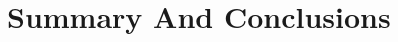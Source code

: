 \documentclass[useAMS,usenatbib]{mn2e_x}
\begin{document}








\section{Summary And Conclusions}
\end{document}
